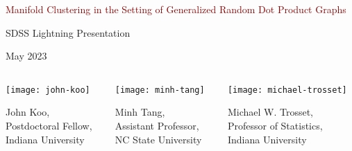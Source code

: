 \documentclass[
  ignorenonframetext,
]{beamer}
\author[John Koo]{John Koo}
\author{}
\date{\vspace{-2.5em}}
\begin{document}
\begin{frame}[plain]{}
\protect\hypertarget{section}{}
\center

\LARGE

\textcolor{darkred}{Manifold Clustering in the Setting of Generalized Random Dot Product Graphs}

\normalsize

SDSS Lightning Presentation

May 2023

\begin{columns}[T]
\begin{column}{0.33\textwidth}
\begin{center}\texttt{[image: john-koo]} \end{center}

John Koo,\\
Postdoctoral Fellow,\\
Indiana University
\end{column}

\begin{column}{0.33\textwidth}
\begin{center}\texttt{[image: minh-tang]} \end{center}

Minh Tang,\\
Assistant Professor,\\
NC State University
\end{column}

\begin{column}{0.33\textwidth}
\begin{center}\texttt{[image: michael-trosset]} \end{center}

Michael W. Trosset,\\
Professor of Statistics,\\
Indiana University
\end{column}
\end{columns}
\end{frame}
\end{document}
